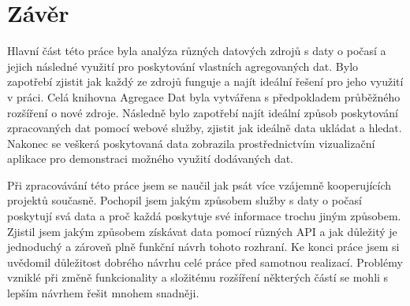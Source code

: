 \documentclass[czech,bachelor,dept460,male,csharp,cpdeclaration]{diploma}
\begin{document}
	\chapter{Závěr}
	
	Hlavní část této práce byla analýza různých datových zdrojů s daty o počasí a jejich následné využití pro poskytování vlastních agregovaných dat. Bylo zapotřebí zjistit jak každý ze zdrojů funguje a najít ideální řešení pro jeho využití v práci. Celá knihovna Agregace Dat byla vytvářena s předpokladem průběžného rozšíření o nové zdroje. Následně bylo zapotřebí najít ideální způsob poskytování zpracovaných dat pomocí webové služby, zjistit jak ideálně data ukládat a hledat. Nakonec se veškerá poskytovaná data zobrazila prostřednictvím vizualizační aplikace pro demonstraci možného využití dodávaných dat.
	
	Při zpracovávání této práce jsem se naučil jak psát více vzájemně kooperujících projektů současně. Pochopil jsem jakým způsobem služby s daty o počasí poskytují svá data a proč každá poskytuje své informace trochu jiným způsobem. Zjistil jsem jakým způsobem získávat data pomocí různých API a jak důležitý je jednoduchý a zároveň plně funkční návrh tohoto rozhraní. Ke konci práce jsem si uvědomil důležitost dobrého návrhu celé práce před samotnou realizací. Problémy vzniklé při změně funkcionality a složitému rozšíření některých částí se mohli s lepším návrhem řešit mnohem snadněji.
	
	\printbibliography[title={Literatura}, heading=bibintoc]
	
	
\end{document}
